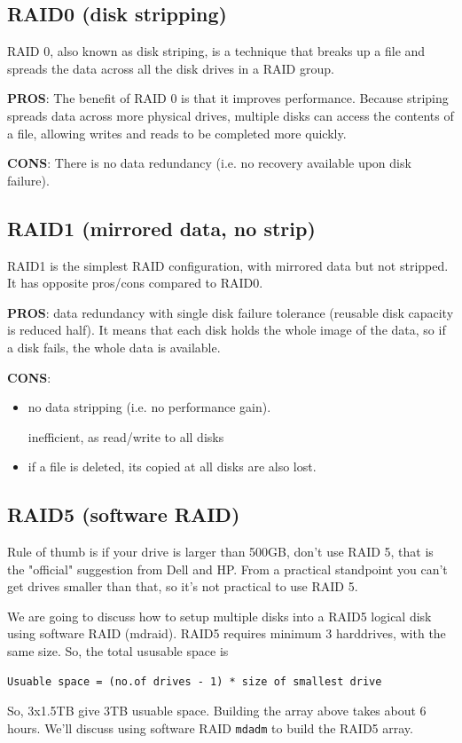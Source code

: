 \subsection{RAID0 (disk stripping)}
\label{sec:RAID0}

RAID 0, also known as disk striping, is a technique that breaks up a file and
spreads the data across all the disk drives in a RAID group.

{\bf PROS}: The benefit of RAID 0 is that it improves performance. Because
striping spreads data across more physical drives, multiple disks can access the
contents of a file, allowing writes and reads to be completed more quickly.

{\bf CONS}: There is no data redundancy (i.e. no recovery available upon disk
failure). 


\subsection{RAID1 (mirrored data, no strip)}
\label{sec:RAID1}

RAID1 is the simplest RAID configuration, with mirrored data but not stripped.
It has opposite pros/cons compared to RAID0.

{\bf PROS}: data redundancy with single disk failure tolerance (reusable disk
capacity is reduced half). It means that each
disk holds the whole image of the data, so if a disk fails, the whole data is
available. 

{\bf CONS}:  
\begin{itemize}
  \item no data stripping (i.e. no performance gain).
  
  inefficient, as read/write to all disks
  
  \item if a file is deleted, its copied at all disks are also lost.
\end{itemize}



\subsection{RAID5 (software RAID)}
\label{sec:RAID5}

Rule of thumb is if your drive is larger than 500GB, don't use RAID 5, that is
the "official" suggestion from Dell and HP. From a practical standpoint you
can't get drives smaller than that, so it's not practical to use RAID 5.


We are going to discuss how to setup multiple disks into a RAID5 logical disk
using software RAID (mdraid). RAID5 requires minimum 3 harddrives, with the same
size. So, the total ususable space is
\begin{verbatim}
Usuable space = (no.of drives - 1) * size of smallest drive
\end{verbatim}
So, 3x1.5TB give 3TB usuable space. Building the array above takes about 6
hours. We'll discuss using software RAID \verb!mdadm! to build the RAID5 array. 

